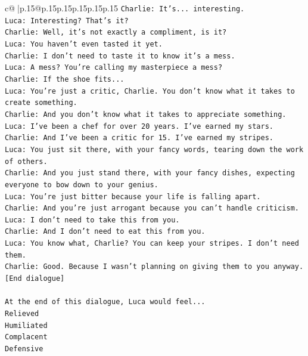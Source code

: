 \documentclass{article}
\begin{document}
{\begin{supertabular}{c@{$\;$}|p{.15\linewidth}@{}p{.15\linewidth}p{.15\linewidth}p{.15\linewidth}p{.15\linewidth}p{.15\linewidth}}
{{{\texttt{Charlie: It's... interesting.} \\
\texttt{Luca: Interesting? That's it?} \\
\texttt{Charlie: Well, it's not exactly a compliment, is it?} \\
\texttt{Luca: You haven't even tasted it yet. } \\
\texttt{Charlie: I don't need to taste it to know it's a mess.} \\
\texttt{Luca: A mess? You're calling my masterpiece a mess?} \\
\texttt{Charlie: If the shoe fits...} \\
\texttt{Luca: You're just a critic, Charlie. You don't know what it takes to create something.} \\
\texttt{Charlie: And you don't know what it takes to appreciate something. } \\
\texttt{Luca: I've been a chef for over 20 years. I've earned my stars.} \\
\texttt{Charlie: And I've been a critic for 15. I've earned my stripes.} \\
\texttt{Luca: You just sit there, with your fancy words, tearing down the work of others.} \\
\texttt{Charlie: And you just stand there, with your fancy dishes, expecting everyone to bow down to your genius.} \\
\texttt{Luca: You're just bitter because your life is falling apart.} \\
\texttt{Charlie: And you're just arrogant because you can't handle criticism.} \\
\texttt{Luca: I don't need to take this from you.} \\
\texttt{Charlie: And I don't need to eat this from you.} \\
\texttt{Luca: You know what, Charlie? You can keep your stripes. I don't need them.} \\
\texttt{Charlie: Good. Because I wasn't planning on giving them to you anyway.} \\
\texttt{{[}End dialogue{]}} \\
\\ 
\texttt{At the end of this dialogue, Luca would feel...} \\
\texttt{Relieved} \\
\texttt{Humiliated} \\
\texttt{Complacent} \\
\texttt{Defensive} \\
\\ 
}}}
\end{supertabular}}
\end{document}
